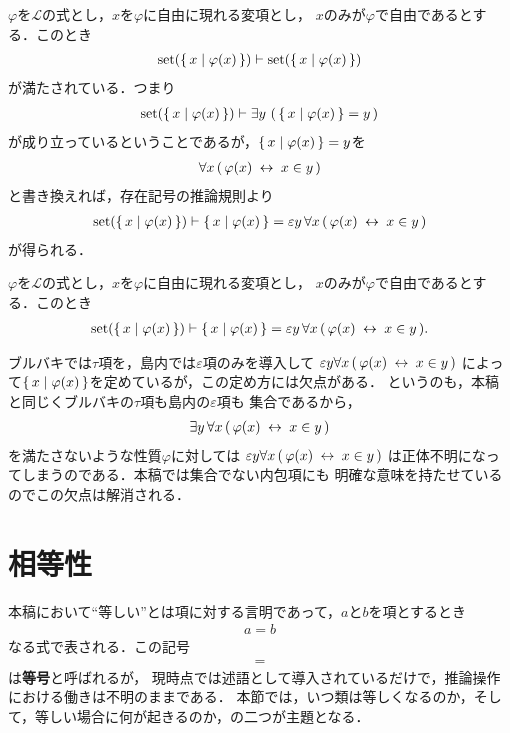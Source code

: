 
	$\varphi$を$\mathcal{L}$の式とし，$x$を$\varphi$に自由に現れる変項とし，
	$x$のみが$\varphi$で自由であるとする．このとき
	\begin{align}
		\operatorname*{set} (\left\{\, x \mid \varphi(x)\, \right\}) \vdash \operatorname*{set} (\left\{\, x \mid \varphi(x)\, \right\})
	\end{align}
	が満たされている．つまり
	\begin{align}
		\operatorname*{set} (\left\{\, x \mid \varphi(x)\, \right\})
		\vdash \exists y\, \left(\, \left\{\, x \mid \varphi(x)\, \right\} = y\, \right)
	\end{align}
	が成り立っているということであるが，$\left\{\, x \mid \varphi(x)\, \right\} = y$を
	\begin{align}
		\forall x\, (\, \varphi(x) \hspace{0.25em}\leftrightarrow\hspace{0.25em} x \in y\, )
	\end{align}
	と書き換えれば，存在記号の推論規則より
	\begin{align}
		\operatorname*{set} (\left\{\, x \mid \varphi(x)\, \right\}) \vdash \left\{\, x \mid \varphi(x)\, \right\} = 
		\varepsilon y\, \forall x\, (\, \varphi(x) \hspace{0.25em}\leftrightarrow\hspace{0.25em} x \in y\, )
	\end{align}
	が得られる．
	
	\begin{screen}
		\begin{thm}
			$\varphi$を$\mathcal{L}$の式とし，$x$を$\varphi$に自由に現れる変項とし，
			$x$のみが$\varphi$で自由であるとする．このとき
			\begin{align}
				\operatorname*{set} (\left\{\, x \mid \varphi(x)\, \right\}) \vdash \left\{\, x \mid \varphi(x)\, \right\} 
				= \varepsilon y\, \forall x\, (\, \varphi(x) \hspace{0.25em}\leftrightarrow\hspace{0.25em} x \in y\, ).
			\end{align}
		\end{thm}
	\end{screen}
	
	ブルバキ\cite{key4}では$\tau$項を，島内\cite{key6}では$\varepsilon$項のみを導入して
	$\varepsilon y \forall x\, (\, \varphi(x) \hspace{0.25em}\leftrightarrow\hspace{0.25em} x \in y\, )$
	によって$\left\{\, x \mid \varphi(x)\, \right\}$を定めているが，この定め方には欠点がある．
	というのも，本稿と同じくブルバキ\cite{key4}の$\tau$項も島内\cite{key6}の$\varepsilon$項も
	集合であるから，
	\begin{align}
		\exists y\, \forall x\, (\, \varphi(x) \hspace{0.25em}\leftrightarrow\hspace{0.25em} x \in y\, )
	\end{align}
	を満たさないような性質$\varphi$に対しては
	$\varepsilon y \forall x\, (\, \varphi(x) \hspace{0.25em}\leftrightarrow\hspace{0.25em} x \in y\, )$
	は正体不明になってしまうのである．本稿では集合でない内包項にも
	明確な意味を持たせているのでこの欠点は解消される．
	
\section{相等性}
	本稿において``等しい''とは項に対する言明であって，$a$と$b$を項とするとき
	\begin{align}
		a = b
	\end{align}
	なる式で表される．この記号
	\begin{align}
		=
	\end{align}
	は{\bf 等号}と呼ばれるが，
	現時点では述語として導入されているだけで，推論操作における働きは不明のままである．
	本節では，いつ類は等しくなるのか，そして，等しい場合に何が起きるのか，の二つが主題となる．
	

